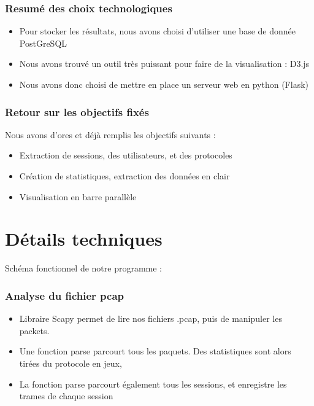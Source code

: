 \documentclass{beamer}
\begin{document}
  \begin{frame}
  \frametitle{Resumé des choix technologiques}
   \begin{itemize}
    \item Pour stocker les résultats, nous avons choisi d'utiliser une base de donnée PostGreSQL
    \item Nous avons trouvé un outil très puissant pour faire de la visualisation : D3.js
    \item Nous avons donc choisi de mettre en place un serveur web en python (Flask)
   \end{itemize}
  \end{frame}
  
  \begin{frame}
  \frametitle{Retour sur les objectifs fixés}
    Nous avons d'ores et déjà remplis les objectifs suivants :
    \begin{itemize}
     \item Extraction de sessions, des utilisateurs, et des protocoles
     \item Création de statistiques, extraction des données en clair
     \item Visualisation en barre parallèle
    \end{itemize}
  \end{frame}
  
  \section{Détails techniques}
  \begin{frame}
   Schéma fonctionnel de notre programme :
  \end{frame}
  \begin{frame}
    \frametitle{Analyse du fichier pcap}
    \begin{itemize}
     \item Libraire Scapy permet de lire nos fichiers .pcap, puis de manipuler les packets.\\
     \item Une fonction parse parcourt tous les paquets. Des statistiques sont alors tirées du protocole en jeux, \\
     \item La fonction parse parcourt également tous les sessions, et enregistre les trames de chaque session\\
    \end{itemize}
  \end{frame}
  
\end{document}
